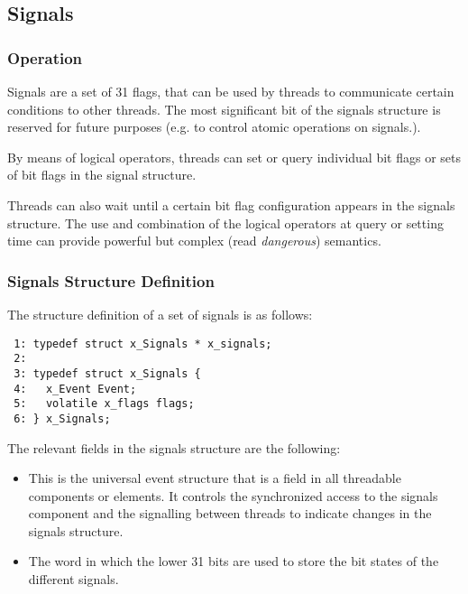 %
%

\subsection{Signals}

\subsubsection{Operation}

Signals are a set of 31 flags, that can be used by threads to communicate certain
conditions to other threads. The most significant bit of the signals
structure is reserved for future purposes (e.g. to control atomic operations
on signals.).

By means of logical operators, threads can set or query individual bit flags
or sets of bit flags in the signal structure.

Threads can also wait until a certain bit flag configuration appears in the
signals structure. The use and combination of the logical operators at query
or setting time can provide powerful but complex (read \textit{dangerous}) semantics.

\subsubsection{Signals Structure Definition}

The structure definition of a set of signals is as follows:

\bcode
\begin{verbatim}
 1: typedef struct x_Signals * x_signals;
 2:
 3: typedef struct x_Signals {
 4:   x_Event Event;
 5:   volatile x_flags flags;
 6: } x_Signals;
\end{verbatim}
\ecode

The relevant fields in the signals structure are the following:

\begin{itemize}
\item {} This is the universal event structure that is a field
in all threadable components or elements. It controls the synchronized access
to the signals component and the signalling between threads to indicate changes
in the signals structure.
\item {} The word in which the lower 31
bits are used to store the bit states of the different signals.
\end{itemize}


